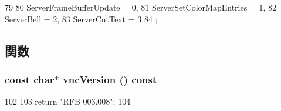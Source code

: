 \begin{DoxyCode}
79                         {
80         ServerFrameBufferUpdate     = 0,
81         ServerSetColorMapEntries    = 1,
82         ServerBell                  = 2,
83         ServerCutText               = 3
84     };
\end{DoxyCode}


\subsection{関数}
\hypertarget{group__VncConstants_ga36bab5b0163b272b816361d6214c3f14}{
\subsubsection[{vncVersion}]{\setlength{\rightskip}{0pt plus 5cm}const char$\ast$ vncVersion () const}}
\label{group__VncConstants_ga36bab5b0163b272b816361d6214c3f14}



\begin{DoxyCode}
102     {
103         return "RFB 003.008\n";
104     }
\end{DoxyCode}


